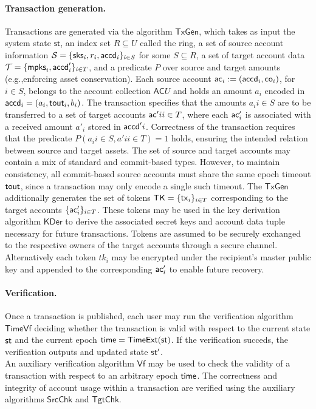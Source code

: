 \paragraph*{Transaction generation.} Transactions are generated via the algorithm $\mathsf{TxGen}$, which takes as input the system state $\mathsf{st}$, an index set $R \subseteq U$ called the ring, a set of source account information  $\mathcal{S} = \{ \mathsf{sks}_i, r_i, \mathsf{accd}_i \}_{i \in S}$ for some $S \subseteq R$, a set of target account data $\mathcal{T} = \{ \mathsf{mpks}_i, \mathsf{accd}'_i \}_{i \in T}$, and a predicate $P$ over source and target amounts (e.g.,enforcing asset conservation). Each source account $\mathsf{ac}_i := (\mathsf{accd}_i, \mathsf{co}_i)$, for $i \in S$, belongs to the account collection $\mathsf{AC}U$ and holds an amount $a_i$ encoded in $\mathsf{accd}_i = (a_i, \mathsf{tout}_i, b_i)$. The transaction specifies that the amounts ${ a_i }{i \in S}$ are to be transferred to a set of target accounts ${ \mathsf{ac}'i }{i \in T}$, where each $\mathsf{ac}'_i$ is associated with a received amount $a'_i$ stored in $\mathsf{accd}'i$. Correctness of the transaction requires that the predicate $P({ a_i }{i \in S}, { a'i }{i \in T}) = 1$ holds, ensuring the intended relation between source and target assets. The set of source and target accounts may contain a mix of standard and commit-based types. However, to maintain consistency, all commit-based source accounts must share the same epoch timeout $\mathsf{tout}$, since a transaction may only encode a single such timeout.
 The $\mathsf{TxGen}$ additionally generates the set of tokens $\mathsf{TK} = \{ \mathsf{tx}_i \}_{i \in T}$ corresponding to the target accounts $\{ \mathsf{ac}'_i \}_{i \in T}$. These tokens may be used in the key derivation algorithm $\mathsf{KDer}$ to derive the associated secret keys and account data tuple necessary for future transactions. Tokens are assumed to be securely exchanged to the respective owners of the target accounts through a secure channel. Alternatively each token $tk_i$ may be encrypted under the recipient's master public key and  appended to the corresponding $\mathsf{ac}'_i$ to enable future recovery. \\

\paragraph*{Verification.}
Once a transaction is published, each user may run the verification algorithm $\mathsf{TimeVf}$ deciding whether the transaction is valid with respect to the current state $\st$ and the current epoch $\time = \mathsf{TimeExt}(\st)$. If the verification succeds, the verification outputs and updated state $\st'$. \\
An auxiliary verification algorithm $\mathsf{Vf}$ may be used to check the validity of a transaction with respect to an arbitrary epoch $\mathsf{time}$.
The correctness and integrity of account usage within a transaction are verified using the auxiliary algorithms $\mathsf{SrcChk}$ and $\mathsf{TgtChk}$.

